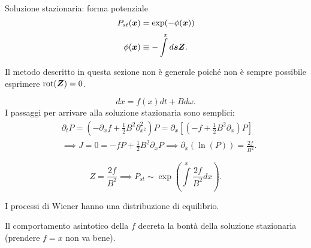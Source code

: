 \begin{redbox}{Soluzione stazionaria: forma potenziale}
    \begin{equation}
	P_{st}(\boldsymbol{x})  = \exp (-\phi (\boldsymbol{x})) 
	\label{eq:11_forma_pot}
    \end{equation}
     \[
	\phi (\boldsymbol{x}) \equiv - \int\limits^{x} d\boldsymbol{s}\boldsymbol{Z} 
    .\] 
\end{redbox}
\noindent
Il metodo descritto in questa sezione non è generale poiché non è sempre possibile esprimere $\text{rot}(\boldsymbol{Z}) = 0$.
\begin{exmp}
    \[
	dx = f(x) dt + Bd\omega
    .\] 
    I passaggi per arrivare alla soluzione stazionaria sono semplici:
    \[\begin{aligned}
	&\partial_{t}P = \left(- \partial_{x}f + \frac{1}{2} B^2\partial^2_{x^2}\right)P = \partial_x \left[\left(-f + \frac{1}{2}B^2\partial_x\right)P\right] \\
	&\implies J = 0 = - f P + \frac{1}{2}B^2\partial_x P \implies  \partial_x (\ln (P) ) = \frac{2f}{B^2}
    .\end{aligned}\]

    \[
	Z = \frac{2f}{B^2} \implies
	P_{st}\sim \exp\left(\int\limits^{x} \frac{2f}{B^2}dx \right) 
    .\] 
    \begin{greenbox}{}
        I processi di Wiener hanno una distribuzione di equilibrio.
    \end{greenbox}
    \noindent
    Il comportamento asintotico della $f$ decreta la bontà della soluzione stazionaria (prendere $f = x$ non va bene).
\end{exmp}
\noindent

